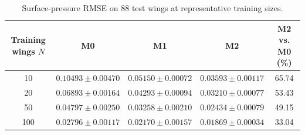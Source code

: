 \begin{table}[!t]
    \centering
    \caption{Surface-pressure RMSE on 88 test wings at representative training sizes.}
    \label{tab:cp-data-efficiency}
    \small
    \renewcommand{\arraystretch}{1.15}
    \begin{tabular}{ccccc}
        \hline
        Training wings $N$ & M0 & M1 & M2 & M2 vs. M0 (\%) \\
        \hline
        10  & $0.10493 \pm 0.00470$ & $0.05150 \pm 0.00072$ & $0.03593 \pm 0.00117$ & 65.74 \\
        20  & $0.06893 \pm 0.00164$ & $0.04293 \pm 0.00094$ & $0.03210 \pm 0.00077$ & 53.43 \\
        50  & $0.04797 \pm 0.00250$ & $0.03258 \pm 0.00210$ & $0.02434 \pm 0.00079$ & 49.15 \\
        100 & $0.02796 \pm 0.00117$ & $0.02170 \pm 0.00157$ & $0.01869 \pm 0.00034$ & 33.04 \\
        \hline
    \end{tabular}
\end{table}
